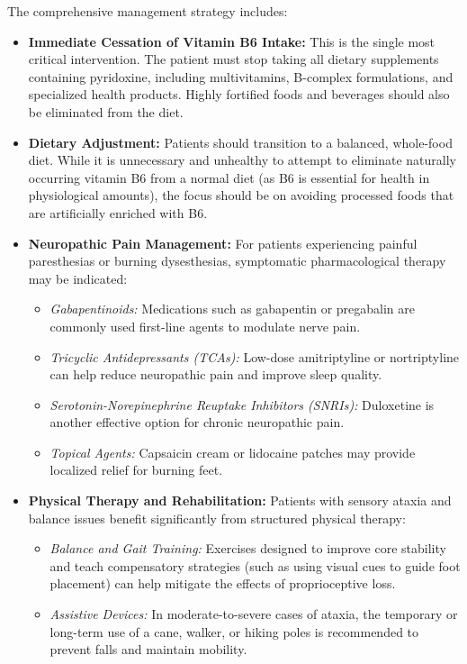 The comprehensive management strategy includes:
\begin{itemize}
    \item \textbf{Immediate Cessation of Vitamin B6 Intake:} This is the single most critical intervention. The patient must stop taking all dietary supplements containing pyridoxine, including multivitamins, B-complex formulations, and specialized health products. Highly fortified foods and beverages should also be eliminated from the diet.
    \item \textbf{Dietary Adjustment:} Patients should transition to a balanced, whole-food diet. While it is unnecessary and unhealthy to attempt to eliminate naturally occurring vitamin B6 from a normal diet (as B6 is essential for health in physiological amounts), the focus should be on avoiding processed foods that are artificially enriched with B6.
    \item \textbf{Neuropathic Pain Management:} For patients experiencing painful paresthesias or burning dysesthesias, symptomatic pharmacological therapy may be indicated:
    \begin{itemize}
        \item \textit{Gabapentinoids:} Medications such as gabapentin or pregabalin are commonly used first-line agents to modulate nerve pain.
        \item \textit{Tricyclic Antidepressants (TCAs):} Low-dose amitriptyline or nortriptyline can help reduce neuropathic pain and improve sleep quality.
        \item \textit{Serotonin-Norepinephrine Reuptake Inhibitors (SNRIs):} Duloxetine is another effective option for chronic neuropathic pain.
        \item \textit{Topical Agents:} Capsaicin cream or lidocaine patches may provide localized relief for burning feet.
    \end{itemize}
    \item \textbf{Physical Therapy and Rehabilitation:} Patients with sensory ataxia and balance issues benefit significantly from structured physical therapy:
    \begin{itemize}
        \item \textit{Balance and Gait Training:} Exercises designed to improve core stability and teach compensatory strategies (such as using visual cues to guide foot placement) can help mitigate the effects of proprioceptive loss.
        \item \textit{Assistive Devices:} In moderate-to-severe cases of ataxia, the temporary or long-term use of a cane, walker, or hiking poles is recommended to prevent falls and maintain mobility.

\end{itemize}
\end{itemize}

